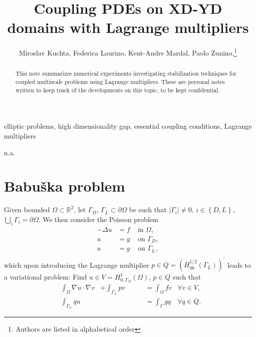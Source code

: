 \documentclass[r]{siamart171218}
\title{Coupling PDEs on XD-YD domains with Lagrange multipliers}
\author{
Miroslav Kuchta, Federica Laurino, Kent-Andre Mardal, Paolo Zunino,\thanks{Authors are listed in alphabetical order}
}
\begin{document}
\maketitle

\begin{abstract}
  This note summarizes numerical experiments investigating stabilization
  techniques for coupled multiscale problems using Lagrange multipliers.
  These are personal notes written to keep track of the developments on this
  topic, to be kept confidential.
\end{abstract}

\begin{keywords}
elliptic problems, high dimensionality gap, essential coupling conditions, Lagrange multipliers
\end{keywords}

\begin{AMS}
n.a.
\end{AMS}

 
\newcommand{\semi}[1]{\lvert{#1}\rvert}
\newcommand{\norm}[1]{\lVert{#1}\rVert}
\newcommand{\jump}[1]{\ensuremath{[\![#1]\!]} }
\newcommand{\avg}[1]{\ensuremath{\left\{\!\left\{#1\right\}\!\right\}} }


\newtheorem{thm}{Theorem}[section]
\newtheorem{prop}{Property}[section]
\theoremstyle{remark}
\newtheorem{remark}{Remark}[section]
 

\section{Babu{\v s}ka problem}\label{sec:babuska}
Given bounded $\Omega\subset\mathbb{R}^2$, let $\Gamma_D$, $\Gamma_L \subset \partial \Omega$ be such that $\semi{\Gamma_i}\neq 0$,
$i\in\left\{D, L\right\}$, $\bigcup_{i}\Gamma_i=\partial\Omega$.
We then consider the Poisson problem 
\[
\begin{aligned}
-\Delta u &= f &\mbox{ in }\Omega,\\
u &= g &\mbox{ on }\Gamma_D,\\
u &= g &\mbox{ on }\Gamma_L,\\
\end{aligned}
\]
which upon introducing the Lagrange multiplier $p\in Q=(H^{1/2}_{00}(\Gamma_L))^{\prime}$
leads to a variational problem: Find $u\in V=H^1_{0, \Gamma_D}(\Omega)$,
$p\in Q$ such that
%
\begin{equation}\label{eq:bab}
  \begin{aligned}
    &\int_{\Omega} \nabla u\cdot \nabla v &+ \int_{\Gamma_L}p v &= \int_{\Omega} f v &\forall v\in V,\\
    &\int_{\Gamma_L}q u  &\phantom{+\int_{\Omega} \nabla u\cdot \nabla v} &= \int_{\Gamma} g q &\forall q\in Q.
  \end{aligned}
\end{equation}
%
\end{document}
